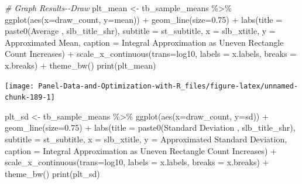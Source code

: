 \documentclass[
]{book}
\newenvironment{Shaded}{\begin{snugshade}}{\end{snugshade}}
\newcommand{\AttributeTok}[1]{\textcolor[rgb]{0.77,0.63,0.00}{#1}}
\newcommand{\CommentTok}[1]{\textcolor[rgb]{0.56,0.35,0.01}{\textit{#1}}}
\newcommand{\FloatTok}[1]{\textcolor[rgb]{0.00,0.00,0.81}{#1}}
\newcommand{\FunctionTok}[1]{\textcolor[rgb]{0.00,0.00,0.00}{#1}}
\newcommand{\NormalTok}[1]{#1}
\newcommand{\OtherTok}[1]{\textcolor[rgb]{0.56,0.35,0.01}{#1}}
\newcommand{\SpecialCharTok}[1]{\textcolor[rgb]{0.00,0.00,0.00}{#1}}
\newcommand{\StringTok}[1]{\textcolor[rgb]{0.31,0.60,0.02}{#1}}
\begin{document}
\begin{Shaded}
\begin{Highlighting}[]
\CommentTok{\# Graph Results{-}{-}Draw}
\NormalTok{plt\_mean }\OtherTok{\textless{}{-}}\NormalTok{ tb\_sample\_means }\SpecialCharTok{\%\textgreater{}\%}
  \FunctionTok{ggplot}\NormalTok{(}\FunctionTok{aes}\NormalTok{(}\AttributeTok{x=}\NormalTok{draw\_count, }\AttributeTok{y=}\NormalTok{mean)) }\SpecialCharTok{+}
  \FunctionTok{geom\_line}\NormalTok{(}\AttributeTok{size=}\FloatTok{0.75}\NormalTok{) }\SpecialCharTok{+}
  \FunctionTok{labs}\NormalTok{(}\AttributeTok{title =} \FunctionTok{paste0}\NormalTok{(}\StringTok{\textquotesingle{}Average \textquotesingle{}}\NormalTok{, slb\_title\_shr),}
       \AttributeTok{subtitle =}\NormalTok{ st\_subtitle,}
       \AttributeTok{x =}\NormalTok{ slb\_xtitle,}
       \AttributeTok{y =} \StringTok{\textquotesingle{}Approximated Mean\textquotesingle{}}\NormalTok{,}
       \AttributeTok{caption =} \StringTok{\textquotesingle{}Integral Approximation as Uneven Rectangle Count Increases\textquotesingle{}}\NormalTok{) }\SpecialCharTok{+}
  \FunctionTok{scale\_x\_continuous}\NormalTok{(}\AttributeTok{trans=}\StringTok{\textquotesingle{}log10\textquotesingle{}}\NormalTok{, }\AttributeTok{labels =}\NormalTok{ x.labels, }\AttributeTok{breaks =}\NormalTok{ x.breaks) }\SpecialCharTok{+}
  \FunctionTok{theme\_bw}\NormalTok{()}
\FunctionTok{print}\NormalTok{(plt\_mean)}
\end{Highlighting}
\end{Shaded}

\begin{center}\texttt{[image: Panel-Data-and-Optimization-with-R\_files/figure-latex/unnamed-chunk-189-1]} \end{center}

\begin{Shaded}
\begin{Highlighting}[]
\NormalTok{plt\_sd }\OtherTok{\textless{}{-}}\NormalTok{ tb\_sample\_means }\SpecialCharTok{\%\textgreater{}\%}
  \FunctionTok{ggplot}\NormalTok{(}\FunctionTok{aes}\NormalTok{(}\AttributeTok{x=}\NormalTok{draw\_count, }\AttributeTok{y=}\NormalTok{sd)) }\SpecialCharTok{+}
  \FunctionTok{geom\_line}\NormalTok{(}\AttributeTok{size=}\FloatTok{0.75}\NormalTok{) }\SpecialCharTok{+}
  \FunctionTok{labs}\NormalTok{(}\AttributeTok{title =} \FunctionTok{paste0}\NormalTok{(}\StringTok{\textquotesingle{}Standard Deviation \textquotesingle{}}\NormalTok{, slb\_title\_shr),}
       \AttributeTok{subtitle =}\NormalTok{ st\_subtitle,}
       \AttributeTok{x =}\NormalTok{ slb\_xtitle,}
       \AttributeTok{y =} \StringTok{\textquotesingle{}Approximated Standard Deviation\textquotesingle{}}\NormalTok{,}
       \AttributeTok{caption =} \StringTok{\textquotesingle{}Integral Approximation as Uneven Rectangle Count Increases\textquotesingle{}}\NormalTok{) }\SpecialCharTok{+}
  \FunctionTok{scale\_x\_continuous}\NormalTok{(}\AttributeTok{trans=}\StringTok{\textquotesingle{}log10\textquotesingle{}}\NormalTok{, }\AttributeTok{labels =}\NormalTok{ x.labels, }\AttributeTok{breaks =}\NormalTok{ x.breaks) }\SpecialCharTok{+}
  \FunctionTok{theme\_bw}\NormalTok{()}
\FunctionTok{print}\NormalTok{(plt\_sd)}
\end{Highlighting}
\end{Shaded}
\end{document}
